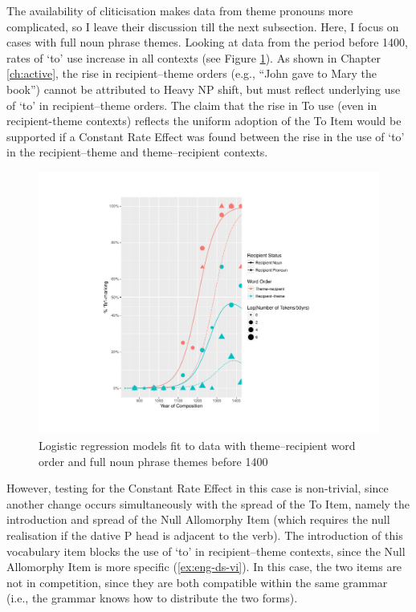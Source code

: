 	The availability of cliticisation makes data from theme pronouns more complicated, so I leave their discussion till the next subsection. Here, I focus on cases with full noun phrase themes. Looking at data from the period before 1400, rates of `to' use increase in all contexts (see Figure \ref{fig:to-use-bf-1400}). As shown in Chapter \ref{ch:active}, the rise in recipient--theme orders (e.g., ``John gave to Mary the book'') cannot be attributed to Heavy NP shift, but must reflect underlying use of `to' in recipient--theme orders. The claim that the rise in To use (even in recipient-theme contexts) reflects the uniform adoption of the To Item would be supported if a Constant Rate Effect was found between the rise in the use of `to' in the recipient--theme and theme--recipient contexts.

	\begin{figure}[ht!]
		\includegraphics[width=\linewidth]{../images/to-use-bf-1400}
		\caption{Logistic regression models fit to data with theme--recipient word order and full noun phrase themes before 1400}
		\label{fig:to-use-bf-1400}
	\end{figure}

	However, testing for the Constant Rate Effect in this case is non-trivial, since another change occurs simultaneously with the spread of the To Item, namely the introduction and spread of the Null Allomorphy Item (which requires the null realisation if the dative P head is adjacent to the verb). The introduction of this vocabulary item blocks the use of `to' in recipient--theme contexts, since the Null Allomorphy Item is more specific (\ref{ex:eng-ds-vi}). In this case, the two items are not in competition, since they are both compatible within the same grammar (i.e., the grammar knows how to distribute the two forms).

